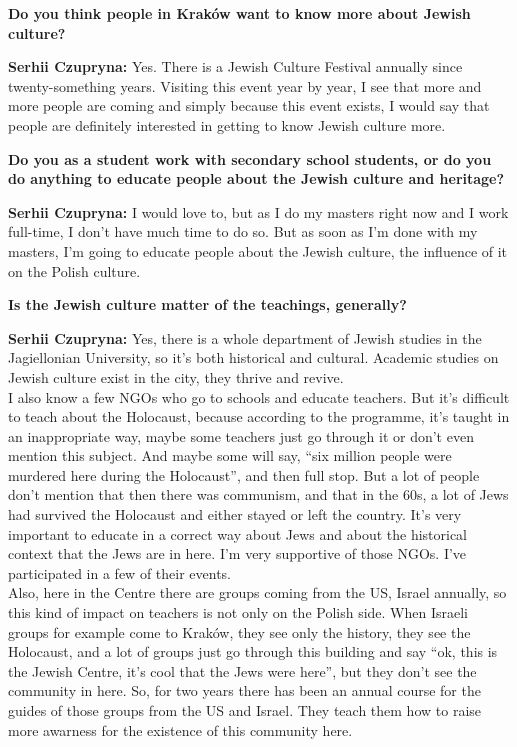 \textbf{Do you think people in Kraków want to know more about Jewish culture?}\par
\textbf{Serhii Czupryna:} Yes. There is a Jewish Culture Festival annually since twenty-something years. Visiting this event year by year, I see that more and more people are coming and simply because this event exists, I would say that people are definitely interested in getting to know Jewish culture more.\par
\textbf{Do you as a student work with secondary school students, or do you do anything to educate people about the Jewish culture and heritage?} \par
\textbf{Serhii Czupryna:} I would love to, but as I do my masters right now and I work full-time, I don’t have much time to do so. But as soon as I’m done with my masters, I’m going to educate people about the Jewish culture, the influence of it on the Polish culture.\par
\textbf{Is the Jewish culture matter of the teachings, generally?}\par
\textbf{Serhii Czupryna:} Yes, there is a whole department of Jewish studies in the Jagiellonian University, so it’s both historical and cultural. Academic studies on Jewish culture exist in the city, they thrive and revive.\\ 
I also know a few NGOs who go to schools and educate teachers. But it’s difficult to teach about the Holocaust, because according to the programme, it’s taught in an inappropriate way, maybe some teachers just go through it or don’t even mention this subject. And maybe some will say, “six million people were murdered here during the Holocaust”, and then full stop. But a lot of people don’t mention that then there was communism, and that in the 60s, a lot of Jews had survived the Holocaust and either stayed or left the country. It’s very important to educate in a correct way about Jews and about the historical context that the Jews are in here. I’m very supportive of those NGOs. I’ve participated in a few of their events.\\
Also, here in the Centre there are groups coming from the US, Israel annually, so this kind of impact on teachers is not only on the Polish side. When Israeli groups for example come to Kraków, they see only the history, they see the Holocaust, and a lot of groups just go through this building and say “ok, this is the Jewish Centre, it’s cool that the Jews were here”, but they don’t see the community in here. So, for two years there has been an annual course for the guides of those groups from the US and Israel. They teach them how to raise more awarness for the existence of this community here.\par  
